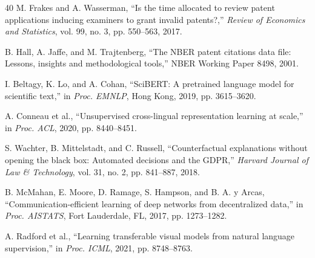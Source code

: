 \documentclass[conference]{IEEEtran}
\begin{document}
\begin{thebibliography}{40}
M. Frakes and A. Wasserman, ``Is the time allocated to review patent applications inducing examiners to grant invalid patents?,'' \textit{Review of Economics and Statistics}, vol. 99, no. 3, pp. 550--563, 2017.

B. Hall, A. Jaffe, and M. Trajtenberg, ``The NBER patent citations data file: Lessons, insights and methodological tools,'' NBER Working Paper 8498, 2001.

I. Beltagy, K. Lo, and A. Cohan, ``SciBERT: A pretrained language model for scientific text,'' in \textit{Proc. EMNLP}, Hong Kong, 2019, pp. 3615--3620.

A. Conneau et al., ``Unsupervised cross-lingual representation learning at scale,'' in \textit{Proc. ACL}, 2020, pp. 8440--8451.

S. Wachter, B. Mittelstadt, and C. Russell, ``Counterfactual explanations without opening the black box: Automated decisions and the GDPR,'' \textit{Harvard Journal of Law \& Technology}, vol. 31, no. 2, pp. 841--887, 2018.

B. McMahan, E. Moore, D. Ramage, S. Hampson, and B. A. y Arcas, ``Communication-efficient learning of deep networks from decentralized data,'' in \textit{Proc. AISTATS}, Fort Lauderdale, FL, 2017, pp. 1273--1282.

A. Radford et al., ``Learning transferable visual models from natural language supervision,'' in \textit{Proc. ICML}, 2021, pp. 8748--8763.

\end{thebibliography}
\end{document}
